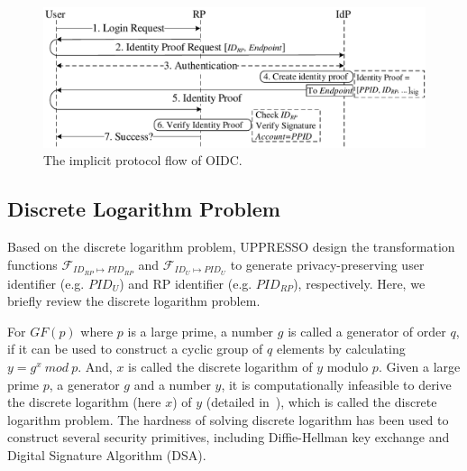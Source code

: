 \begin{figure}[t]
  \centering
  \includegraphics[width=\linewidth]{fig/OIDC1.pdf}
  \caption{The implicit protocol flow of OIDC.}
  \label{fig:OpenID}
\end{figure}

\subsection{Discrete Logarithm Problem}
\label{sec:dlp}

Based on the discrete logarithm problem, UPPRESSO design the transformation functions $\mathcal{F}_{ID_{RP} \mapsto PID_{RP}}$ and $\mathcal{F}_{ID_{U} \mapsto PID_{U}}$ to generate privacy-preserving user identifier (e.g. $PID_U$) and RP identifier (e.g. $PID_{RP}$), respectively. Here, we briefly review the discrete logarithm problem.

For $GF(p)$ where $p$ is a large prime, a number $g$ is called a generator of order $q$, if it can be used to construct a cyclic  group of $q$ elements by calculating $y=g^x \ mod\ p$.
And, $x$ is called the discrete logarithm of $y$ modulo $p$. Given a large prime $p$, a generator $g$ and a number $y$, it is computationally infeasible to derive the discrete logarithm (here $x$) of $y$ (detailed in~\cite{WXWM}), which is called the discrete logarithm problem. The hardness of solving discrete logarithm has been used to construct several security primitives, including Diffie-Hellman key exchange and Digital Signature Algorithm (DSA).

